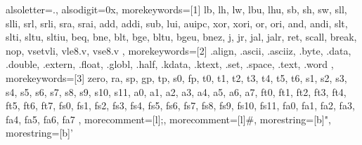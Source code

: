 {
    alsoletter={.}, %
    alsodigit={0x}, %
    morekeywords=[1]{ %
            lb, lh, lw, lbu, lhu,
            sb, sh, sw,
            sll, slli, srl, srli, sra, srai,
            add, addi, sub, lui, auipc,
            xor, xori, or, ori, and, andi,
            slt, slti, sltu, sltiu,
            beq, bne, blt, bge, bltu, bgeu, bnez,
            j, jr, jal, jalr, ret,
            scall, break, nop,
            vsetvli,
            vle8.v,
            vse8.v
        },
    morekeywords=[2]{ %
            .align, .ascii, .asciiz, .byte, .data, .double, .extern,
            .float, .globl, .half, .kdata, .ktext, .set, .space, .text, .word
        },
    morekeywords=[3]{ %
            zero, ra, sp, gp, tp, s0, fp,
            t0, t1, t2, t3, t4, t5, t6,
            s1, s2, s3, s4, s5, s6, s7, s8, s9, s10, s11,
            a0, a1, a2, a3, a4, a5, a6, a7,
            ft0, ft1, ft2, ft3, ft4, ft5, ft6, ft7,
            fs0, fs1, fs2, fs3, fs4, fs5, fs6, fs7, fs8, fs9, fs10, fs11,
            fa0, fa1, fa2, fa3, fa4, fa5, fa6, fa7
        },
    morecomment=[l]{;},   %
    morecomment=[l]{\#},  %
    morestring=[b]",      %
    morestring=[b]'       %
}
